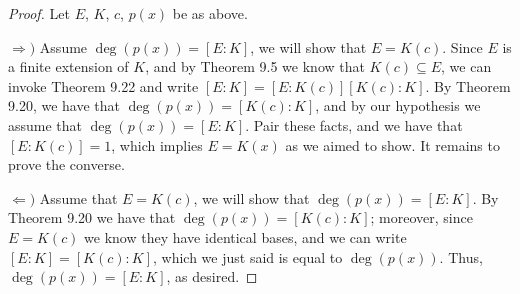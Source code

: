 \documentclass[letterpaper, 12pt]{amsart}
\begin{document}
	\begin{proof}
		Let $E$, $K$, $c$, $p(x)$ be as above.

		$\Rightarrow)$ Assume $\deg(p(x)) = [E:K]$, we will show that $E = K(c)$.
		Since $E$ is a finite extension of $K$, and by Theorem 9.5 we know that $K(c) \subseteq E$, we can invoke Theorem 9.22 and write $[E:K] = [E:K(c)][K(c):K]$.
		By Theorem 9.20, we have that $\deg(p(x)) = [K(c):K]$, and by our hypothesis we assume that $\deg(p(x)) = [E:K]$.
		Pair these facts, and we have that $[E:K(c)] = 1$, which implies $E = K(x)$ as we aimed to show.
		It remains to prove the converse.

		$\Leftarrow)$ Assume that $E = K(c)$, we will show that $\deg(p(x)) = [E:K]$.
		By Theorem 9.20 we have that $\deg(p(x)) = [K(c):K]$; moreover, since $E = K(c)$ we know they have identical bases, and we can write $[E:K] = [K(c):K]$, which we just said is equal to $\deg(p(x))$.
		Thus, $\deg(p(x)) = [E:K]$, as desired.
	\end{proof}
\end{document}
